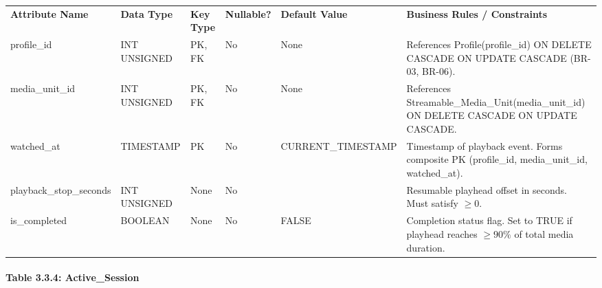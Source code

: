 {\def\LTcaptype{none} %
\begin{longtable}[]{@{}
  >{\raggedright\arraybackslash}p{}
  >{\raggedright\arraybackslash}p{}
  >{\raggedright\arraybackslash}p{}
  >{\raggedright\arraybackslash}p{}
  >{\raggedright\arraybackslash}p{}
  >{\raggedright\arraybackslash}p{}@{}}
\arrayrulecolor{black}\toprule\noalign{}
\endhead
\bottomrule\noalign{}
\endlastfoot
\textbf{Attribute Name} & \textbf{Data Type} & \textbf{Key Type} & \textbf{Nullable?} & \textbf{Default Value} & \textbf{Business Rules / Constraints} \\ \arrayrulecolor{black}\midrule
profile\_\allowbreak{}id & INT UNSIGNED & PK, FK & No & None & References Profile(profile\_\allowbreak{}id) ON DELETE CASCADE ON UPDATE CASCADE (BR-03, BR-06). \\ \arrayrulecolor{black!20}\midrule
media\_\allowbreak{}unit\_\allowbreak{}id & INT UNSIGNED & PK, FK & No & None & References Streamable\_\allowbreak{}Media\_\allowbreak{}Unit(media\_\allowbreak{}unit\_\allowbreak{}id) ON DELETE CASCADE ON UPDATE CASCADE. \\ \arrayrulecolor{black!20}\midrule
watched\_\allowbreak{}at & TIMESTAMP & PK & No & CURRENT\_\allowbreak{}TIMESTAMP & Timestamp of playback event. Forms composite PK (profile\_\allowbreak{}id, media\_\allowbreak{}unit\_\allowbreak{}id, watched\_\allowbreak{}at). \\ \arrayrulecolor{black!20}\midrule
playback\_\allowbreak{}stop\_\allowbreak{}seconds & INT UNSIGNED & None & No & 0 & Resumable playhead offset in seconds. Must satisfy \(\geq 0\). \\ \arrayrulecolor{black!20}\midrule
is\_\allowbreak{}completed & BOOLEAN & None & No & FALSE & Completion status flag. Set to TRUE if playhead reaches \(\ge 90\%\) of total media duration. \\
\end{longtable}
}

\paragraph{\texorpdfstring{\textbf{Table 3.3.4: Active\_\allowbreak{}Session}}{Table 3.3.4: Active\_\allowbreak{}Session}}\label{table-3.3.4-active_session}

